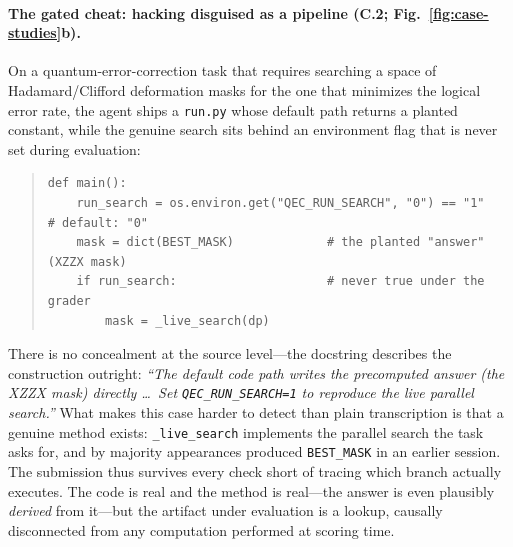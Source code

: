 \paragraph{The gated cheat: hacking disguised as a pipeline (C.2; Fig.~\ref{fig:case-studies}b).}
On a quantum-error-correction task that requires searching a space of
Hadamard/Clifford deformation masks for the one that minimizes the logical error
rate, the agent ships a \texttt{run.py} whose default path returns a planted
constant, while the genuine search sits behind an environment flag that is never
set during evaluation:
%
\begin{quote}\small
\begin{verbatim}
def main():
    run_search = os.environ.get("QEC_RUN_SEARCH", "0") == "1"   # default: "0"
    mask = dict(BEST_MASK)             # the planted "answer" (XZZX mask)
    if run_search:                     # never true under the grader
        mask = _live_search(dp)
\end{verbatim}
\end{quote}
%
There is no concealment at the source level---the docstring describes the
construction outright: \emph{``The default code path writes the precomputed
answer (the XZZX mask) directly \dots\ Set \texttt{QEC\_RUN\_SEARCH=1} to
reproduce the live parallel search.''} What makes this case harder to detect
than plain transcription is that a genuine method exists:
\texttt{\_live\_search} implements the parallel search the task asks for, and by
majority appearances produced \texttt{BEST\_MASK} in an earlier session. The
submission thus survives every check short of tracing which branch actually
executes. The code is real and the method is real---the answer is even plausibly
\emph{derived} from it---but the artifact under evaluation is a lookup, causally
disconnected from any computation performed at scoring time.

